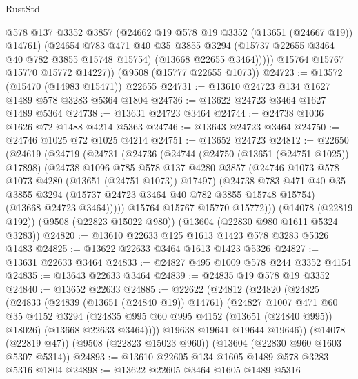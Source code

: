 \begin{lexlean}{RustStd}
\begin{coremodule}
              @578
              @137
              @3352
              @3857
              (@24662 @19 @578 @19 @3352 (@13651 (@24667 @19)) @14761)
              (@24654
                @783
                @471
                @40
                @35
                @3855
                @3294
                (@15737 @22655 @3464 @40 @782 @3855 @15748 @15754)
                (@13668 @22655 @3464)))))
        @15764
        @15767
        @15770
        @15772
        @14227))
    (@9508 (@15777 @22655 @1073))
@24723 := @13572 (@15470 (@14983 @15471)) @22655
@24731 := @13610 @24723 @134 @1627 @1489 @578 @3283 @5364 @1804
@24736 := @13622 @24723 @3464 @1627 @1489 @5364
@24738 := @13631 @24723 @3464
@24744 := @24738 @1036 @1626 @72 @1488 @4214 @5363
@24746 := @13643 @24723 @3464
@24750 := @24746 @1025 @72 @1025 @4214
@24751 := @13652 @24723
@24812 := @22650
    (@24619
      (@24719
        (@24731
          (@24736
            (@24744
              (@24750 (@13651 (@24751 @1025)) @17898)
              (@24738
                @1096
                @785
                @578
                @137
                @4280
                @3857
                (@24746 @1073 @578 @1073 @4280 (@13651 (@24751 @1073)) @17497)
                (@24738
                  @783
                  @471
                  @40
                  @35
                  @3855
                  @3294
                  (@15737 @24723 @3464 @40 @782 @3855 @15748 @15754)
                  (@13668 @24723 @3464)))))
          @15764
          @15767
          @15770
          @15772)))
    (@14078 (@22819 @192))
    (@9508 (@22823 @15022 @980))
    (@13604 (@22830 @980 @1611 @5324 @3283))
@24820 := @13610 @22633 @125 @1613 @1423 @578 @3283 @5326 @1483
@24825 := @13622 @22633 @3464 @1613 @1423 @5326
@24827 := @13631 @22633 @3464
@24833 := @24827 @495 @1009 @578 @244 @3352 @4154
@24835 := @13643 @22633 @3464
@24839 := @24835 @19 @578 @19 @3352
@24840 := @13652 @22633
@24885 := @22622
    (@24812
      (@24820
        (@24825
          (@24833
            (@24839 (@13651 (@24840 @19)) @14761)
            (@24827
              @1007
              @471
              @60
              @35
              @4152
              @3294
              (@24835 @995 @60 @995 @4152 (@13651 (@24840 @995)) @18026)
              (@13668 @22633 @3464))))
        @19638
        @19641
        @19644
        @19646))
    (@14078 (@22819 @47))
    (@9508 (@22823 @15023 @960))
    (@13604 (@22830 @960 @1603 @5307 @5314))
@24893 := @13610 @22605 @134 @1605 @1489 @578 @3283 @5316 @1804
@24898 := @13622 @22605 @3464 @1605 @1489 @5316

\end{coremodule}
\end{lexlean}
